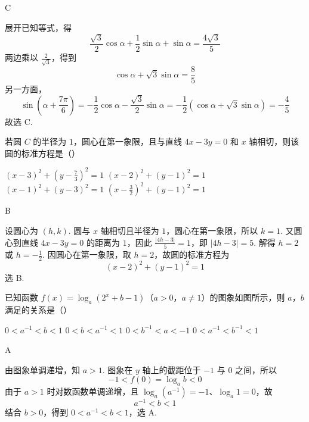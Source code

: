 \begin{answer}
C
\end{answer}

\begin{solution}
展开已知等式，得
\[
\frac{\sqrt3}{2}\cos\alpha+\frac12\sin\alpha+\sin\alpha
 =\frac{4\sqrt3}{5}
\]
两边乘以 \(\frac2{\sqrt3}\)，得到
\[
\cos\alpha+\sqrt3\sin\alpha=\frac85
\]
另一方面，
\[
\sin\left(\alpha+\frac{7\pi}{6}\right)
 =-\frac12\cos\alpha-\frac{\sqrt3}{2}\sin\alpha
 =-\frac12\left(\cos\alpha+\sqrt3\sin\alpha\right)
 =-\frac45
\]
故选 C.
\end{solution}

\begin{problem}
若圆 \(C\) 的半径为 \(1\)，圆心在第一象限，且与直线 \(4x - 3y = 0\) 和 \(x\) 轴相切，则该圆的标准方程是（\quad）

\choices
    {\((x - 3)^{2} + \left(y - \frac{7}{3}\right)^{2} = 1\)}
    {\((x - 2)^{2} + (y - 1)^{2} = 1\)}
    {\((x - 1)^{2} + (y - 3)^{2} = 1\)}
    {\(\left(x - \frac{3}{2}\right)^2 + (y - 1)^2 = 1\)}
\end{problem}

\begin{answer}
B
\end{answer}

\begin{solution}
设圆心为 \((h,k)\). 圆与 \(x\) 轴相切且半径为 \(1\)，圆心在第一象限，所以 \(k=1\). 又圆心到直线 \(4x-3y=0\) 的距离为 \(1\)，因此 \(\frac{|4h-3|}{5}=1\)，即 \(|4h-3|=5\). 解得 \(h=2\) 或 \(h=-\frac12\). 因圆心在第一象限，取 \(h=2\)，故圆的标准方程为
\[
(x-2)^2+(y-1)^2=1
\]
选 B.
\end{solution}

\begin{problem}
已知函数 \( f(x)=\log_{a}(2^{x}+b-1) \)（\(a>0\)，\(a\neq1\)）的图象如图所示，则 \(a\)，\(b\) 满足的关系是（\quad）


\choices
    {\(0 < a^{-1} < b < 1\)}
    {\(0 < b < a^{-1} < 1\)}
    {\(0 < b^{-1} < a < -1\)}
    {\(0 < a^{-1} < b^{-1} < 1\)}
\end{problem}

\begin{answer}
A
\end{answer}

\begin{solution}
由图象单调递增，知 \(a>1\). 图象在 \(y\) 轴上的截距位于 \(-1\) 与 \(0\) 之间，所以
\[
-1< f(0)=\log_a b<0
\]
由于 \(a>1\) 时对数函数单调递增，且 \(\log_a(a^{-1})=-1\)、\(\log_a1=0\)，故
\[
a^{-1}<b<1
\]
结合 \(b>0\)，得到 \(0<a^{-1}<b<1\)，选 A.
\end{solution}

